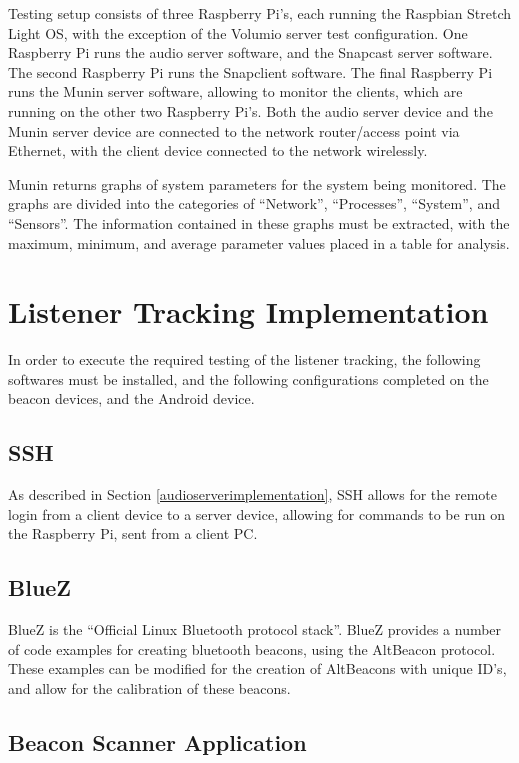 \documentclass[11pt,a4paper,headinclude=false,footinclude=false]{scrreprt}
\begin{document}
Testing setup consists of three Raspberry Pi's, each running the
Raspbian Stretch Light OS, with the exception of the Volumio server test
configuration. One Raspberry Pi runs the audio server software, and the
Snapcast server software. The second Raspberry Pi runs the Snapclient
software. The final Raspberry Pi runs the Munin server software,
allowing to monitor the clients, which are running on the other two
Raspberry Pi's. Both the audio server device and the Munin server device
are connected to the network router/access point via Ethernet, with the
client device connected to the network wirelessly.

Munin returns graphs of system parameters for the system being
monitored. The graphs are divided into the categories of ``Network'',
``Processes'', ``System'', and ``Sensors''. The information contained in
these graphs must be extracted, with the maximum, minimum, and average
parameter values placed in a table for analysis.

\section{Listener Tracking
Implementation}\label{listener-tracking-implementation}

In order to execute the required testing of the listener tracking, the
following softwares must be installed, and the following configurations
completed on the beacon devices, and the Android device.

\subsection{SSH}\label{ssh-1}

As described in Section \ref{audioserverimplementation}, SSH allows for
the remote login from a client device to a server device, allowing for
commands to be run on the Raspberry Pi, sent from a client PC.

\subsection{BlueZ}\label{bluez}

BlueZ is the ``Official Linux Bluetooth protocol stack''\cite{bluez}.
BlueZ provides a number of code examples for creating bluetooth beacons,
using the AltBeacon protocol. These examples can be modified for the
creation of AltBeacons with unique ID's, and allow for the calibration
of these beacons.

\subsection{Beacon Scanner
Application}\label{beacon-scanner-application}
\end{document}
